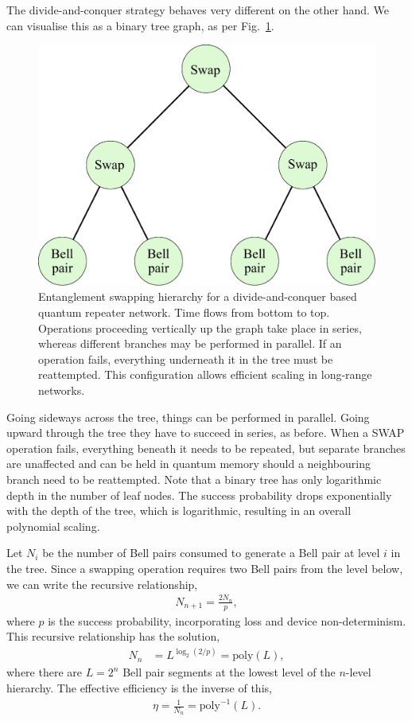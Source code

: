 The divide-and-conquer strategy behaves very different on the other hand. We can visualise this as a binary tree graph, as per Fig.~\ref{fig:rep_tree}.

\begin{figure}[!htb]
	\centering
	\includegraphics[width=\columnwidth]{figures/Repeater_tree}
	\caption{Entanglement swapping hierarchy for a divide-and-conquer based quantum repeater network. Time flows from bottom to top. Operations proceeding vertically up the graph take place in series, whereas different branches may be performed in parallel. If an operation fails, everything underneath it in the tree must be reattempted. This configuration allows efficient scaling in long-range networks.} \label{fig:rep_tree}
\end{figure}

Going sideways across the tree, things can be performed in parallel. Going upward through the tree they have to succeed in series, as before. When a SWAP operation fails, everything beneath it needs to be repeated, but separate branches are unaffected and can be held in quantum memory should a neighbouring branch need to be reattempted. Note that a binary tree has only logarithmic depth in the number of leaf nodes. The success probability drops exponentially with the depth of the tree, which is logarithmic, resulting in an overall polynomial scaling.

Let $N_i$ be the number of Bell pairs consumed to generate a Bell pair at level $i$ in the tree. Since a swapping operation requires two Bell pairs from the level below, we can write the recursive relationship,
\begin{align}
	N_{n+1} = \frac{2N_n}{p},
\end{align}
where $p$ is the success probability, incorporating loss and device non-determinism. This recursive relationship has the solution,
\begin{align}
	N_n &= L^{\log_2(2/p)} = \mathrm{poly}(L),
\end{align}where there are $L=2^n$ Bell pair segments at the lowest level of the $n$-level hierarchy. The effective efficiency is the inverse of this,
\begin{align}
	\eta = \frac{1}{N_n} = \mathrm{poly}^{-1}(L).
\end{align}

